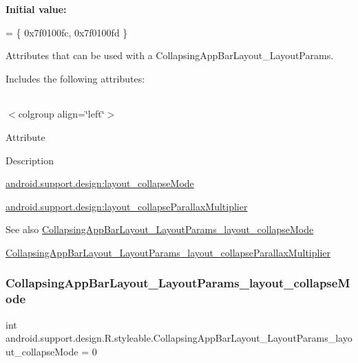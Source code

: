 {\bfseries Initial value\+:}
\begin{DoxyCode}
= \{
            0x7f0100fc, 0x7f0100fd
        \}
\end{DoxyCode}
Attributes that can be used with a Collapsing\+App\+Bar\+Layout\+\_\+\+Layout\+Params. 

Includes the following attributes\+:

\tabulinesep=1mm
\begin{longtabu} spread 0pt [c]{*{0}{|X[-1]}|}
\hline
\end{longtabu}
$<$colgroup align=\char`\"{}left\char`\"{}$>$ 

Attribute

Description 

{\ttfamily \hyperlink{classandroid_1_1support_1_1design_1_1R_1_1styleable_a162718a8ab6d2c197efea52ab9dbd5e4}{android.\+support.\+design\+:layout\+\_\+collapse\+Mode}}

{\ttfamily \hyperlink{classandroid_1_1support_1_1design_1_1R_1_1styleable_a811337664483530d22c06f4cbba2e69c}{android.\+support.\+design\+:layout\+\_\+collapse\+Parallax\+Multiplier}}

\begin{DoxySeeAlso}{See also}
\hyperlink{classandroid_1_1support_1_1design_1_1R_1_1styleable_a162718a8ab6d2c197efea52ab9dbd5e4}{Collapsing\+App\+Bar\+Layout\+\_\+\+Layout\+Params\+\_\+layout\+\_\+collapse\+Mode} 

\hyperlink{classandroid_1_1support_1_1design_1_1R_1_1styleable_a811337664483530d22c06f4cbba2e69c}{Collapsing\+App\+Bar\+Layout\+\_\+\+Layout\+Params\+\_\+layout\+\_\+collapse\+Parallax\+Multiplier} 
\end{DoxySeeAlso}
\mbox{\label{classandroid_1_1support_1_1design_1_1R_1_1styleable_a162718a8ab6d2c197efea52ab9dbd5e4}} 
\subsubsection{\texorpdfstring{Collapsing\+App\+Bar\+Layout\+\_\+\+Layout\+Params\+\_\+layout\+\_\+collapse\+Mode}{CollapsingAppBarLayout\_LayoutParams\_layout\_collapseMode}}
{\footnotesize\ttfamily int android.\+support.\+design.\+R.\+styleable.\+Collapsing\+App\+Bar\+Layout\+\_\+\+Layout\+Params\+\_\+layout\+\_\+collapse\+Mode = 0\hspace{0.3cm}{\ttfamily [static]}}

